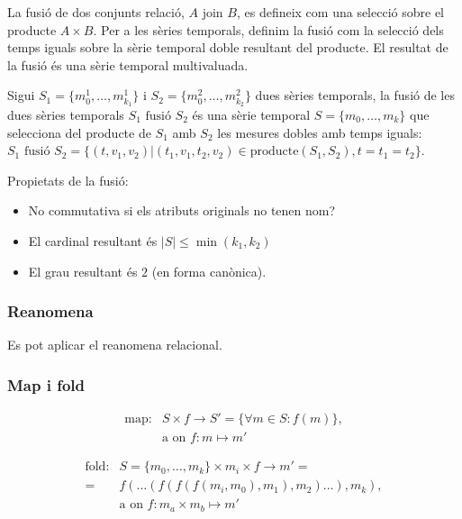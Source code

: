 La fusió de dos conjunts relació, $A \text{ join } B$, es defineix com
una selecció sobre el producte $A \times B$. Per a les sèries
temporals, definim la fusió com la selecció dels temps iguals sobre la
sèrie temporal doble resultant del producte. El resultat de la fusió
és una sèrie temporal multivaluada.
\begin{definition}[fusió]
  Sigui $S_1=\{m_0^1, \dotsc, m_{k_1}^1\}$ i $S_2=\{m_0^2, \dotsc,
  m_{k_2}^2\}$ dues sèries temporals, la fusió de les dues sèries
  temporals $S_1 \text{ fusió } S_2$ és una sèrie temporal $S=\{m_0,
  \dotsc, m_k\}$ que selecciona del producte de $S_1$ amb $S_2$ les
  mesures dobles amb temps iguals: $S_1 \text{ fusió } S_2 = \{
  (t,v_1,v_2) | (t_1,v_1,t_2,v_2) \in \text{producte}(S_1,S_2),
  t=t_1=t_2 \}$.
\end{definition}


Propietats de la fusió:
\begin{itemize}
\item No commutativa si els atributs originals no tenen nom?
\item El cardinal resultant és $|S|\leq\min(k_1,k_2)$
\item El grau resultant és $2$ (en forma canònica).
\end{itemize}



\subsubsection{Reanomena}

Es pot aplicar el reanomena relacional. 






\subsubsection{Map i fold}

\begin{align*}
  \text{map}:& S \times f \longrightarrow S' = \{\forall m\in S : f(m) \}, \\
             & \text{a on } f: m \mapsto m' 
\end{align*}





\begin{align*}
  \text{fold}: & S=\{m_0,\dotsc,m_k\} \times m_i \times f \longrightarrow m'= \\
               =& f(\dots(f(f(f(m_i,m_0),m_1),m_2)\dots),m_k), \\
               & \text{a on } f: m_a \times m_b \mapsto m'
\end{align*}


